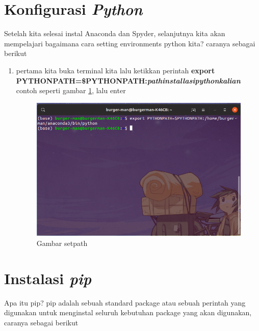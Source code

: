 \section{Konfigurasi \textbf{\textit{Python}}}
Setelah kita selesai instal Anaconda dan Spyder, selanjutnya kita akan mempelajari bagaimana cara setting environments python kita? caranya sebagai berikut

\begin{enumerate}

\item pertama kita buka terminal kita lalu ketikkan perintah \textbf{export PYTHONPATH=\$PYTHONPATH:\textit{pathinstallasipythonkalian}} contoh seperti gambar \ref{setpath}, lalu enter
\begin{figure}[H]
\centering
\includegraphics[width=1\textwidth]{figures/setpath.png}
\caption{Gambar setpath}
\label{setpath}
\end{figure}

\end{enumerate}

\section{Instalasi \textbf{\textit{pip}}}
Apa itu pip? pip adalah sebuah standard package atau sebuah perintah yang digunakan untuk menginstal seluruh kebutuhan package yang akan digunakan, caranya sebagai berikut

